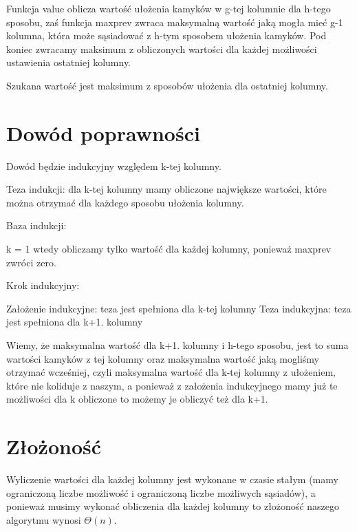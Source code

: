\documentclass[12pt,a4paper]{article}
\begin{document}
Funkcja value oblicza wartość ułożenia kamyków w g-tej kolumnie dla h-tego sposobu, zaś funkcja maxprev zwraca maksymalną wartość jaką mogła mieć g-1 kolumna, która może sąsiadować z h-tym sposobem ułożenia kamyków.
Pod koniec zwracamy maksimum z obliczonych wartości dla każdej możliwości ustawienia ostatniej kolumny.

Szukana wartość jest maksimum z sposobów ułożenia dla ostatniej kolumny.
\section{Dowód poprawności}
Dowód będzie indukcyjny względem k-tej kolumny.

Teza indukcji: dla k-tej kolumny mamy obliczone największe wartości, które można otrzymać dla każdego sposobu ułożenia kolumny.

Baza indukcji:

k = 1
wtedy obliczamy tylko wartość dla każdej kolumny, ponieważ maxprev zwróci zero.

Krok indukcyjny:

Założenie indukcyjne: teza jest spełniona dla k-tej kolumny
Teza indukcyjna: teza jest spełniona dla k+1. kolumny

Wiemy, że maksymalna wartość dla k+1. kolumny i h-tego sposobu, jest to suma wartości kamyków z tej kolumny oraz maksymalna wartość jaką mogliśmy otrzymać wcześniej, czyli maksymalna wartość dla k-tej kolumny z ułożeniem, które nie koliduje z naszym, a ponieważ z założenia indukcyjnego mamy już te możliwości dla k obliczone to możemy je obliczyć też dla k+1.

\section{Złożoność}
Wyliczenie wartości dla każdej kolumny jest wykonane w czasie stałym (mamy ograniczoną liczbe możliwość i ograniczoną liczbe możliwych sąsiadów), a ponieważ musimy wykonać obliczenia dla każdej kolumny to złożoność naszego algorytmu wynosi $\Theta(n)$.
\end{document}
